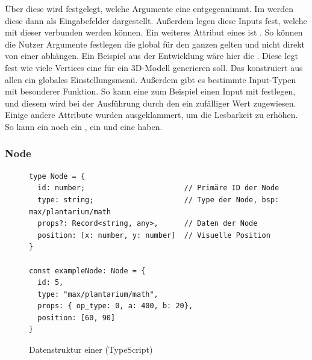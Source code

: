 \documentclass[ngerman]{article}
\begin{document}
Über diese  wird festgelegt, welche Argumente eine  entgegennimmt.
Im  werden diese dann als Eingabefelder dargestellt. Außerdem legen diese Inputs fest,  welche  mit dieser  verbunden werden können. 
\br
Ein weiteres Attribut eines  ist . So können die Nutzer Argumente festlegen die global für den ganzen  gelten und nicht direkt von einer  abhängen. Ein Beispiel aus der Entwicklung wäre hier die . Diese legt fest wie viele Vertices eine  für ein 3D-Modell generieren soll. Das  konstruiert aus allen  ein globales Einstellungsmenü.
\br
Außerdem gibt es bestimmte Input-Typen mit besonderer Funktion. So kann eine  zum Beispiel einen Input mit  festlegen, und diesem wird bei der Ausführung durch den  ein zufälliger Wert zugewiesen.
\br
Einige andere Attribute wurden ausgeklammert, um die Lesbarkeit zu erhöhen. So kann ein  noch ein , ein  und eine  haben.

\subsubsection*{Node}

\begin{figure}[htbp]
  \begin{code}
    \begin{verbatim}
type Node = {
  id: number;                       // Primäre ID der Node
  type: string;                     // Type der Node, bsp: max/plantarium/math
  props?: Record<string, any>,      // Daten der Node
  position: [x: number, y: number]  // Visuelle Position
}

const exampleNode: Node = {
  id: 5,
  type: "max/plantarium/math",
  props: { op_type: 0, a: 400, b: 20},
  position: [60, 90]
}

    \end{verbatim}
  \end{code}

  \caption{Datenstruktur einer  (TypeScript)}
  \label{fig:data_node}

\end{figure}
\end{document}
